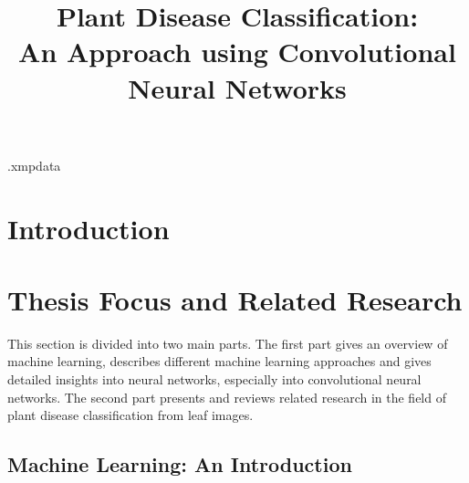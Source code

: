 \documentclass{BachelorBUI}
\title{Plant Disease Classification:\\[0.5em]\LARGE An Approach using Convolutional Neural Networks}
\begin{document}
\begin{filecontents}[overwrite]{\jobname.xmpdata}
\makeatletter
\Title{\@title}
\Author{\@authorname}
\Language{\@thesislanguage}
\Keywords{\@keywords}
\makeatother
\end{filecontents}

\maketitle

\begin{abstract}
\end{abstract}

\clearpage
\tableofcontents

\clearpage
\section{Introduction}


\section{Thesis Focus and Related Research}

    This section is divided into two main parts. The first part gives an overview of machine learning, describes different machine learning approaches and gives detailed insights into neural networks, especially into convolutional neural networks. The second part presents and reviews related research in the field of plant disease classification from leaf images. 

    \subsection{Machine Learning: An Introduction}
    \label{sec:machine-learning-overveiw}
\end{document}
